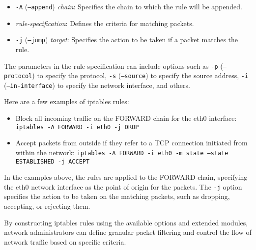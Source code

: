 {	\begin{itemize}
		\item \texttt{-A} (\texttt{--append}) \textit{chain}: Specifies the chain to which the rule will be appended.
		\item \textit{rule-specification}: Defines the criteria for matching packets.
		\item \texttt{-j} (\texttt{--jump}) \textit{target}: Specifies the action to be taken if a packet matches the rule.
	\end{itemize}
	
	The parameters in the rule specification can include options such as \texttt{-p} (\texttt{--protocol}) to specify the protocol, \texttt{-s} (\texttt{--source}) to specify the source address, \texttt{-i} (\texttt{--in-interface}) to specify the network interface, and others.
	
	Here are a few examples of iptables rules:
	
	\begin{itemize}
		\item Block all incoming traffic on the FORWARD chain for the eth0 interface:
		\texttt{iptables -A FORWARD -i eth0 -j DROP}
		
		\item Accept packets from outside if they refer to a TCP connection initiated from within the network:
		\texttt{iptables -A FORWARD -i eth0 -m state --state ESTABLISHED -j ACCEPT}
	\end{itemize}
	
	In the examples above, the rules are applied to the FORWARD chain, specifying the eth0 network interface as the point of origin for the packets. The \texttt{-j} option specifies the action to be taken on the matching packets, such as dropping, accepting, or rejecting them.
	
	By constructing iptables rules using the available options and extended modules, network administrators can define granular packet filtering and control the flow of network traffic based on specific criteria.}
	
	\newpage
